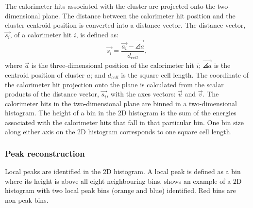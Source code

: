 




The calorimeter hits associated with the cluster are projected onto the two-dimensional plane.  The distance between the calorimeter hit position and the cluster centroid position is converted into a distance vector. The distance vector, $\vec{s_{i}}$, of a calorimeter hit $i$, is defined as:
\begin{equation}
\vec{s_{i}} = \frac{\vec{a_{i}} -  \vec{\angles{a}}}{d_{cell}},
\end{equation}
where $\vec{a}$ is the three-dimensional position of the calorimeter hit $i$;  $\vec{\angles{a}}$ is the centroid position of cluster $a$; and $d_{cell}$ is the  \ECAL square cell length. The coordinate of the calorimeter hit projection onto the plane is calculated from the scalar products of the distance vector, $\vec{s_{i}}$, with the axes vectors: $\vec{u}$ and $\vec{v}$.
The calorimeter hits in the two-dimensional plane are binned in a two-dimensional histogram. The height of a bin in the 2D histogram is the sum of the energies associated with the calorimeter hits that fall in that particular bin. One bin size along either axis on the 2D histogram corresponds to one \ECAL square cell length.


\subsubsection{Peak reconstruction}

Local peaks are identified in the 2D histogram. A local peak is defined as a bin where its height is above all eight neighbouring bins.  shows an example of a 2D histogram with two local peak bins (orange and blue) identified. Red bins are non-peak bins.

